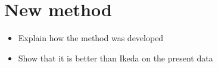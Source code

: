 \section{New method}
\label{se:newMethod}
\begin{itemize}
  \item Explain how the method was developed
  \item Show that it is better than Ikeda on the present data
\end{itemize}
